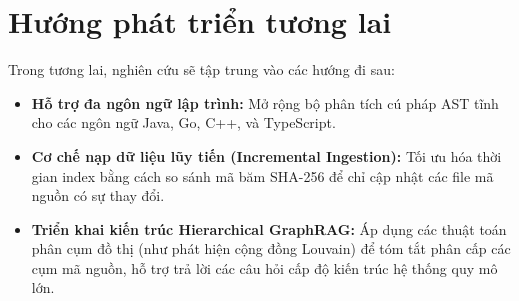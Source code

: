 \documentclass[12pt,a4paper,oneside]{report}
\begin{document}
\section{Hướng phát triển tương lai}
Trong tương lai, nghiên cứu sẽ tập trung vào các hướng đi sau:
\begin{itemize}
    \item \textbf{Hỗ trợ đa ngôn ngữ lập trình:} Mở rộng bộ phân tích cú pháp AST tĩnh cho các ngôn ngữ Java, Go, C++, và TypeScript.
    \item \textbf{Cơ chế nạp dữ liệu lũy tiến (Incremental Ingestion):} Tối ưu hóa thời gian index bằng cách so sánh mã băm SHA-256 để chỉ cập nhật các file mã nguồn có sự thay đổi.
    \item \textbf{Triển khai kiến trúc Hierarchical GraphRAG:} Áp dụng các thuật toán phân cụm đồ thị (như phát hiện cộng đồng Louvain) để tóm tắt phân cấp các cụm mã nguồn, hỗ trợ trả lời các câu hỏi cấp độ kiến trúc hệ thống quy mô lớn.
\end{itemize}
\end{document}
